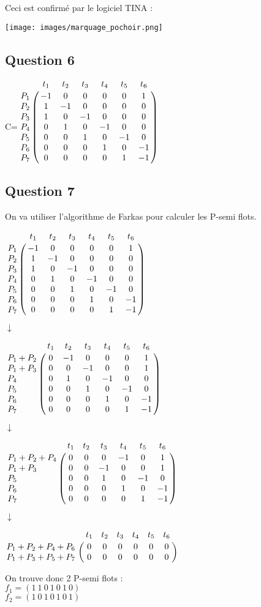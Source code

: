\vspace{1cm}

Ceci est confirmé par le logiciel TINA :
\begin{center}
  \texttt{[image: images/marquage\_pochoir.png]}
\end{center}

\subsection{Question 6}

\vspace{1cm}

\begin{center}

{\Huge C}\qquad =\qquad $\bordermatrix{
&t_1&t_2&t_3&t_4&t_5&t_6\cr
P_1&-1&0&0&0&0&1\cr
P_2&1&-1&0&0&0&0\cr
P_3&1&0&-1&0&0&0\cr
P_4&0&1&0&-1&0&0\cr
P_5&0&0&1&0&-1&0\cr
P_6&0&0&0&1&0&-1\cr
P_7&0&0&0&0&1&-1\cr
}$

\end{center}

\subsection{Question 7}
On va utiliser l'algorithme de Farkas pour calculer les P-semi flots.

\begin{center}

$\bordermatrix{
&t_1&t_2&t_3&t_4&t_5&t_6\cr
P_1&-1&0&0&0&0&1\cr
P_2&1&-1&0&0&0&0\cr
P_3&1&0&-1&0&0&0\cr
P_4&0&1&0&-1&0&0\cr
P_5&0&0&1&0&-1&0\cr
P_6&0&0&0&1&0&-1\cr
P_7&0&0&0&0&1&-1\cr
}$

{\Huge $\downarrow$}

$\bordermatrix{
&t_1&t_2&t_3&t_4&t_5&t_6\cr
P_1+P_2&0&-1&0&0&0&1\cr
P_1+P_3&0&0&-1&0&0&1\cr
P_4&0&1&0&-1&0&0\cr
P_5&0&0&1&0&-1&0\cr
P_6&0&0&0&1&0&-1\cr
P_7&0&0&0&0&1&-1\cr
}$

{\Huge $\downarrow$}

$\bordermatrix{
&t_1&t_2&t_3&t_4&t_5&t_6\cr
P_1+P_2+P_4&0&0&0&-1&0&1\cr
P_1+P_3&0&0&-1&0&0&1\cr
P_5&0&0&1&0&-1&0\cr
P_6&0&0&0&1&0&-1\cr
P_7&0&0&0&0&1&-1\cr
}$

{\Huge $\downarrow$}

$\bordermatrix{
&t_1&t_2&t_3&t_4&t_5&t_6\cr
P_1+P_2+P_4+P_6&0&0&0&0&0&0\cr
P_1+P_3+P_5+P_7&0&0&0&0&0&0\cr
}$

\vspace{1cm}

On trouve donc 2 P-semi flots :\\
$f_1 = (1\ 1\ 0\ 1\ 0\ 1\ 0)$\\
$f_2 = (1\ 0\ 1\ 0\ 1\ 0\ 1)$

\end{center}

